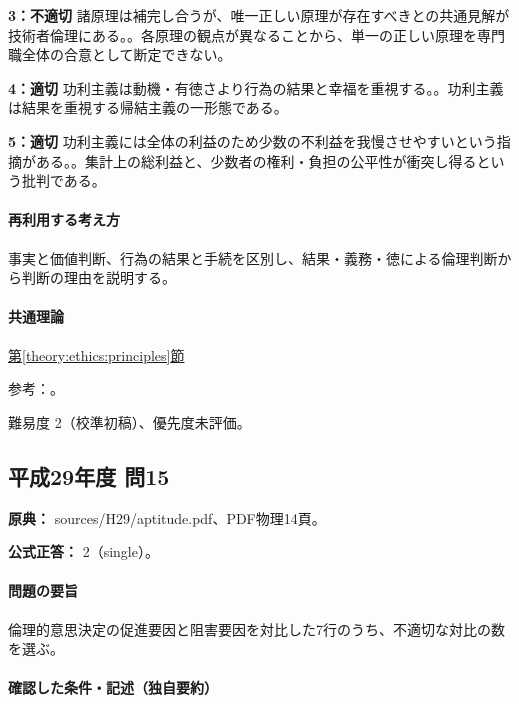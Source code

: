 \noindent\textbf{3：不適切} 諸原理は補完し合うが、唯一正しい原理が存在すべきとの共通見解が技術者倫理にある。。各原理の観点が異なることから、単一の正しい原理を専門職全体の合意として断定できない。\par

\noindent\textbf{4：適切} 功利主義は動機・有徳さより行為の結果と幸福を重視する。。功利主義は結果を重視する帰結主義の一形態である。\par

\noindent\textbf{5：適切} 功利主義には全体の利益のため少数の不利益を我慢させやすいという指摘がある。。集計上の総利益と、少数者の権利・負担の公平性が衝突し得るという批判である。\par

\paragraph{再利用する考え方} 事実と価値判断、行為の結果と手続を区別し、結果・義務・徳による倫理判断から判断の理由を説明する。

\paragraph{共通理論} \hyperref[theory:ethics:principles]{第\ref*{theory:ethics:principles}節}

\par 参考：\cite{scu_ethics_framework}。

\par 難易度 2（校準初稿）、優先度未評価。

\subsection{平成29年度 問15}
\label{q:h29-reg-apt-15}

\noindent\textbf{原典：} sources/H29/aptitude.pdf、PDF物理14頁。

\textbf{公式正答：} 2（single）。

\paragraph{問題の要旨} 倫理的意思決定の促進要因と阻害要因を対比した7行のうち、不適切な対比の数を選ぶ。

\paragraph{確認した条件・記述（独自要約）}\mbox{}\par

